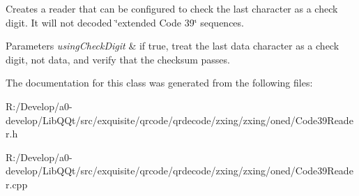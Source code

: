 Creates a reader that can be configured to check the last character as a check digit. It will not decoded \char`\"{}extended Code 39\char`\"{} sequences.


\begin{DoxyParams}{Parameters}
{\em using\+Check\+Digit} & if true, treat the last data character as a check digit, not data, and verify that the checksum passes. \\
\hline
\end{DoxyParams}


The documentation for this class was generated from the following files\+:\begin{DoxyCompactItemize}
\item 
R\+:/\+Develop/a0-\/develop/\+Lib\+Q\+Qt/src/exquisite/qrcode/qrdecode/zxing/zxing/oned/Code39\+Reader.\+h\item 
R\+:/\+Develop/a0-\/develop/\+Lib\+Q\+Qt/src/exquisite/qrcode/qrdecode/zxing/zxing/oned/Code39\+Reader.\+cpp\end{DoxyCompactItemize}
